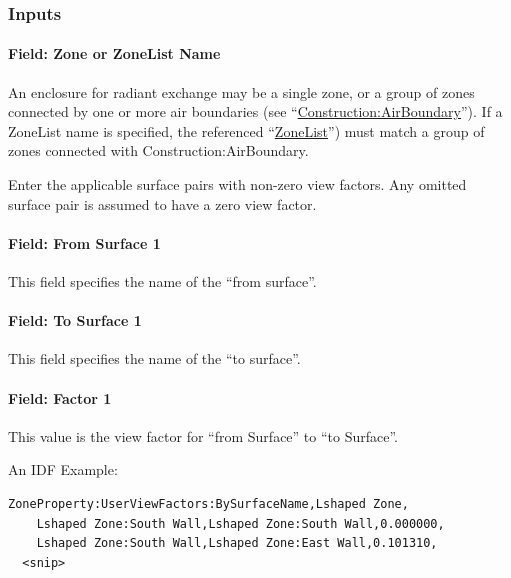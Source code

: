 \subsubsection{Inputs}\label{inputs-17}

\paragraph{Field: Zone or ZoneList Name}\label{zonepropertyuserviewfactorsbysurfacename-field-zone-name}

An enclosure for radiant exchange may be a single zone, or a group of zones connected by one or more air boundaries (see ``\hyperref[constructionairboundary]{Construction:AirBoundary}''). If a ZoneList name is specified, the referenced ``\hyperref[zonelist]{ZoneList}'') must match a group of zones connected with Construction:AirBoundary.

Enter the applicable surface pairs with non-zero view factors. Any omitted surface pair is assumed to have a zero view factor.

\paragraph{Field: From Surface 1}\label{field-from-surface-1}

This field specifies the name of the ``from surface''.

\paragraph{Field: To Surface 1}\label{field-to-surface-1}

This field specifies the name of the ``to surface''.

\paragraph{Field: Factor 1}\label{field-factor-1}

This value is the view factor for ``from Surface'' to ``to Surface''.

An IDF Example:

\begin{lstlisting}
ZoneProperty:UserViewFactors:BySurfaceName,Lshaped Zone,
    Lshaped Zone:South Wall,Lshaped Zone:South Wall,0.000000,
    Lshaped Zone:South Wall,Lshaped Zone:East Wall,0.101310,
  <snip>
\end{lstlisting}
